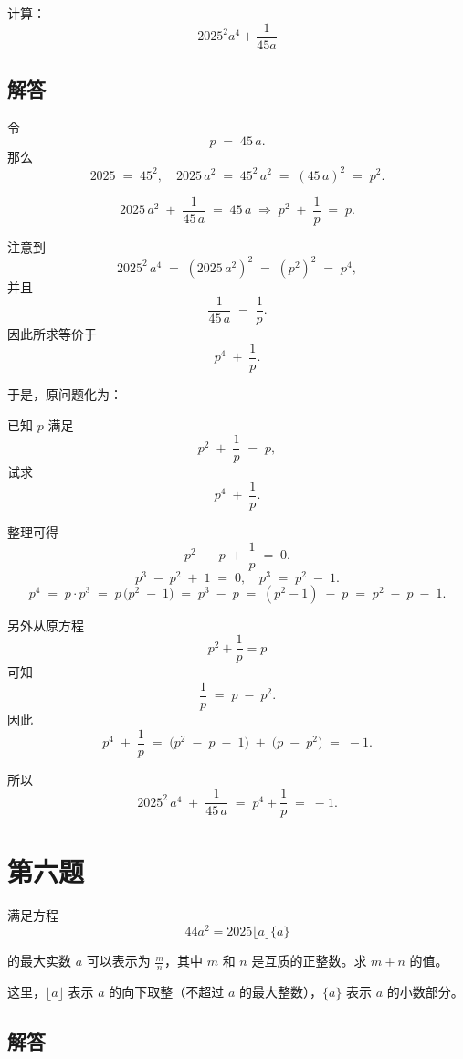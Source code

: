 \documentclass[12pt, a4paper]{article}
\theoremstyle{definition}
\theoremstyle{remark}
\begin{document}
\noindent 计算：
\[
2025^2a^4 + \frac{1}{45a} 
\]


\subsection{解答}

\noindent 令
$$
p \;=\; 45\,a.
$$
那么
$$
2025 \;=\; 45^2,
\quad
2025\,a^2 \;=\; 45^2\,a^2 \;=\; (45\,a)^2 \;=\; p^2.
$$

$$
2025\,a^2 \;+\;\frac{1}{45\,a} \;=\; 45\,a \;\Rightarrow\; p^2 \;+\;\frac{1}{p} \;=\; p.
$$

\noindent 注意到
$$
2025^2\,a^4 
\;=\;
(2025\,a^2)^2 
\;=\;
(p^2)^2 
\;=\;
p^4,
$$
并且
$$
\frac{1}{45\,a} \;=\;\frac{1}{p}.
$$
因此所求等价于
$$
p^4 \;+\;\frac{1}{p}.
$$

\noindent 于是，原问题化为：

已知 \(p\) 满足
$$
p^2 \;+\;\frac{1}{p} \;=\; p,
$$
试求
$$
p^4 \;+\;\frac{1}{p}.
$$

\noindent 整理可得
$$
p^2 \;-\; p \;+\;\frac{1}{p} \;=\; 0.
$$
$$
p^3 \;-\; p^2 \;+\; 1 \;=\; 0,
\quad
p^3 \;=\; p^2 \;-\; 1.
$$
$$
p^4 
\;=\; p \cdot p^3 
\;=\; p\,\bigl(p^2 \;-\; 1\bigr)
\;=\; p^3 \;-\; p
\;=\; (p^2 - 1) \;-\; p
\;=\; p^2 \;-\; p \;-\; 1.
$$

\noindent 另外从原方程
$$
p^2 + \frac{1}{p} = p
$$
可知
$$
\frac{1}{p} \;=\; p \;-\; p^2.
$$
因此
$$
p^4 \;+\;\frac{1}{p}
\;=\;
\bigl(p^2 \;-\; p \;-\; 1\bigr)
\;+\;
\bigl(p \;-\; p^2\bigr)
\;=\;
-1.
$$

\noindent 所以
$$
2025^2\,a^4 \;+\;\frac{1}{45\,a}
\;=\;
p^4 + \frac{1}{p}
\;=\;
-1.
$$

\newpage

\section{第六题}

\noindent 满足方程 
$$
44a^2 = 2025\lfloor a\rfloor \{a\}
$$ 

\noindent 的最大实数 $a$ 可以表示为 $\frac{m}{n}$，其中 $m$ 和 $n$ 是互质的正整数。求 $m+n$ 的值。

\noindent 这里，$\lfloor a\rfloor$ 表示 $a$ 的向下取整（不超过 $a$ 的最大整数），$\{a\}$ 表示 $a$ 的小数部分。


\subsection{解答}
\end{document}
